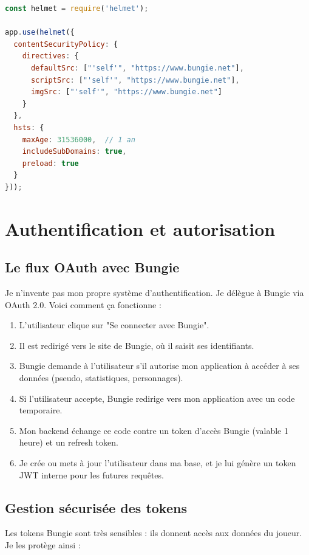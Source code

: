 \begin{lstlisting}[language=JavaScript]
const helmet = require('helmet');

app.use(helmet({
  contentSecurityPolicy: {
    directives: {
      defaultSrc: ["'self'", "https://www.bungie.net"],
      scriptSrc: ["'self'", "https://www.bungie.net"],
      imgSrc: ["'self'", "https://www.bungie.net"]
    }
  },
  hsts: {
    maxAge: 31536000,  // 1 an
    includeSubDomains: true,
    preload: true
  }
}));
\end{lstlisting}

\section{Authentification et autorisation}

\subsection{Le flux OAuth avec Bungie}

Je n'invente pas mon propre système d'authentification. Je délègue à Bungie via OAuth 2.0. Voici comment ça fonctionne :

\begin{enumerate}
    \item L'utilisateur clique sur "Se connecter avec Bungie".
    \item Il est redirigé vers le site de Bungie, où il saisit ses identifiants.
    \item Bungie demande à l'utilisateur s'il autorise mon application à accéder à ses données (pseudo, statistiques, personnages).
    \item Si l'utilisateur accepte, Bungie redirige vers mon application avec un code temporaire.
    \item Mon backend échange ce code contre un token d'accès Bungie (valable 1 heure) et un refresh token.
    \item Je crée ou mets à jour l'utilisateur dans ma base, et je lui génère un token JWT interne pour les futures requêtes.
\end{enumerate}

\subsection{Gestion sécurisée des tokens}

Les tokens Bungie sont très sensibles : ils donnent accès aux données du joueur. Je les protège ainsi :


